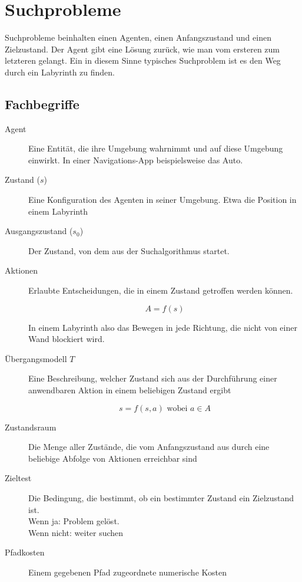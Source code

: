 \section{Suchprobleme}

Suchprobleme beinhalten einen Agenten, einen Anfangszustand und einen Zielzustand. Der Agent gibt eine Lösung zurück, wie man vom ersteren zum letzteren gelangt. Ein in diesem Sinne typisches Suchproblem ist es den Weg durch ein Labyrinth zu finden.

\subsection{Fachbegriffe}
 
\begin{description}
 \item [Agent] Eine Entität, die ihre Umgebung wahrnimmt und auf diese Umgebung einwirkt. In einer Navigations-App beispielsweise das Auto.

 \item [Zustand ($s$)] Eine Konfiguration des Agenten in seiner Umgebung. Etwa die Position in einem Labyrinth

 \item [Ausgangszustand ($s_0$)] Der Zustand, von dem aus der Suchalgorithmus startet. 

 \item [Aktionen] Erlaubte Entscheidungen, die in einem Zustand getroffen werden können. 
    
    \begin{equation}
     A = f(s)
    \end{equation}
    
    In einem Labyrinth also das Bewegen in jede Richtung, die nicht von einer Wand blockiert wird.
    
 \item [Übergangsmodell $T$] Eine Beschreibung, welcher Zustand sich aus der Durchführung einer anwendbaren Aktion in einem beliebigen Zustand ergibt

    \begin{equation}
     s = f(s, a) \text{~wobei~} a \in A
    \end{equation}

 \item [Zustandsraum] Die Menge aller Zustände, die vom Anfangszustand aus durch eine beliebige Abfolge von Aktionen erreichbar sind
 
 \item [Zieltest] Die Bedingung, die bestimmt, ob ein bestimmter Zustand ein Zielzustand ist.\\
 Wenn ja: Problem gelöst. \\
 Wenn nicht: weiter suchen

 \item [Pfadkosten] Einem gegebenen Pfad zugeordnete numerische Kosten
\end{description}

